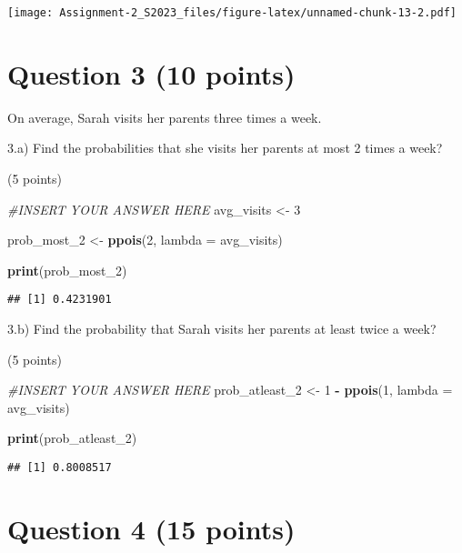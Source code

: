\documentclass[
]{article}
\newenvironment{Shaded}{\begin{snugshade}}{\end{snugshade}}
\newcommand{\AttributeTok}[1]{\textcolor[rgb]{0.13,0.29,0.53}{#1}}
\newcommand{\CommentTok}[1]{\textcolor[rgb]{0.56,0.35,0.01}{\textit{#1}}}
\newcommand{\DecValTok}[1]{\textcolor[rgb]{0.00,0.00,0.81}{#1}}
\newcommand{\FunctionTok}[1]{\textcolor[rgb]{0.13,0.29,0.53}{\textbf{#1}}}
\newcommand{\NormalTok}[1]{#1}
\newcommand{\OtherTok}[1]{\textcolor[rgb]{0.56,0.35,0.01}{#1}}
\newcommand{\SpecialCharTok}[1]{\textcolor[rgb]{0.81,0.36,0.00}{\textbf{#1}}}
\begin{document}
\texttt{[image: Assignment-2\_S2023\_files/figure-latex/unnamed-chunk-13-2.pdf]}

\hypertarget{question-3-10-points}{%
\section{Question 3 (10 points)}\label{question-3-10-points}}

On average, Sarah visits her parents three times a week.

3.a) Find the probabilities that she visits her parents at most 2 times
a week?

(5 points)

\begin{Shaded}
\begin{Highlighting}[]
\CommentTok{\#INSERT YOUR ANSWER HERE}
\NormalTok{avg\_visits }\OtherTok{\textless{}{-}} \DecValTok{3}

\NormalTok{prob\_most\_2 }\OtherTok{\textless{}{-}} \FunctionTok{ppois}\NormalTok{(}\DecValTok{2}\NormalTok{, }\AttributeTok{lambda =}\NormalTok{ avg\_visits)}

\FunctionTok{print}\NormalTok{(prob\_most\_2)}
\end{Highlighting}
\end{Shaded}

\begin{verbatim}
## [1] 0.4231901
\end{verbatim}

3.b) Find the probability that Sarah visits her parents at least twice a
week?

(5 points)

\begin{Shaded}
\begin{Highlighting}[]
\CommentTok{\#INSERT YOUR ANSWER HERE}
\NormalTok{prob\_atleast\_2 }\OtherTok{\textless{}{-}} \DecValTok{1} \SpecialCharTok{{-}} \FunctionTok{ppois}\NormalTok{(}\DecValTok{1}\NormalTok{, }\AttributeTok{lambda =}\NormalTok{ avg\_visits)}

\FunctionTok{print}\NormalTok{(prob\_atleast\_2)}
\end{Highlighting}
\end{Shaded}

\begin{verbatim}
## [1] 0.8008517
\end{verbatim}

\hypertarget{question-4-15-points}{%
\section{Question 4 (15 points)}\label{question-4-15-points}}
\end{document}

